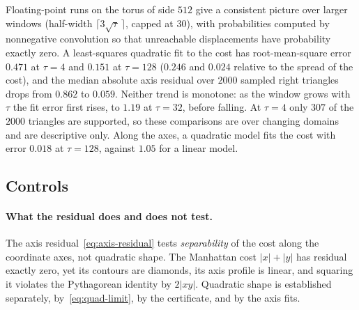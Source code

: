 Floating-point runs on the torus of side $512$ give a consistent picture over larger windows (half-width $\lceil3\sqrt\tau\,\rceil$, capped at $30$), with probabilities computed by nonnegative convolution so that unreachable displacements have probability exactly zero.
A least-squares quadratic fit to the cost has root-mean-square error $0.471$ at $\tau=4$ and $0.151$ at $\tau=128$ ($0.246$ and $0.024$ relative to the spread of the cost), and the median absolute axis residual over $2000$ sampled right triangles drops from $0.862$ to $0.059$.
Neither trend is monotone: as the window grows with $\tau$ the fit error first rises, to $1.19$ at $\tau=32$, before falling.
At $\tau=4$ only $307$ of the $2000$ triangles are supported, so these comparisons are over changing domains and are descriptive only.
Along the axes, a quadratic model fits the cost with error $0.018$ at $\tau=128$, against $1.05$ for a linear model.

\subsection{Controls}

\paragraph{What the residual does and does not test.}
The axis residual~\eqref{eq:axis-residual} tests \emph{separability} of the cost along the coordinate axes, not quadratic shape.
The Manhattan cost $|x|+|y|$ has residual exactly zero, yet its contours are diamonds, its axis profile is linear, and squaring it violates the Pythagorean identity by $2|xy|$.
Quadratic shape is established separately, by~\eqref{eq:quad-limit}, by the certificate, and by the axis fits.

